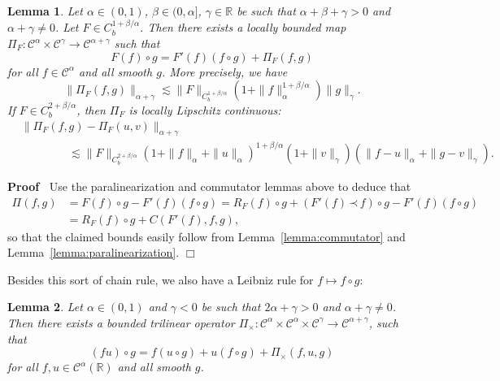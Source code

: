 \documentclass[a4paper,11pt]{article}
\newenvironment{proof}{\noindent\textbf{Proof\ }}{\hspace*{\fill}$\Box$\medskip}
\newtheorem{lemma}{Lemma}
{\theorembodyfont{\rmfamily}\newtheorem{remark}{Remark}}
\newcommand{\CC}{\mathscr{C}}
\newcommand{\lpara}{\,\mathord{\prec}\,}
\newcommand{\reso}{\,\mathord{\circ}\,}
\begin{document}
\begin{lemma}
  \label{lemma:para-taylor}Let $\alpha \in (0, 1)$, $\beta \in (0, \alpha]$,
  $\gamma \in \mathbb{R}$ be such that $\alpha + \beta + \gamma > 0$ and
  $\alpha + \gamma \neq 0$. Let $F \in C^{1 + \beta / \alpha}_b$. Then there
  exists a locally bounded map $\Pi_F : \CC^{\alpha} \times \CC^{\gamma}
  \rightarrow \CC^{\alpha + \gamma}$ such that
  \begin{equation}
    \label{eq:para-taylor} F (f) \reso g = F' (f)  (f \reso g) + \Pi_F (f, g)
  \end{equation}
  for all $f \in \CC^{\alpha}$ and all smooth $g$. More precisely, we have
  \[ \| \Pi_F (f, g)\|_{\alpha + \gamma} \lesssim \|F\|_{C^{1 + \beta /
     \alpha}_b}  (1 +\|f\|_{\alpha}^{1 + \beta / \alpha}) \|g\|_{\gamma} . \]
  If $F \in C^{2 + \beta / \alpha}_b$, then $\Pi_F$ is locally Lipschitz
  continuous:
  \begin{align*}
     &\| \Pi_F (f, g) - \Pi_F (u, v)\|_{\alpha + \gamma} \\
     &\hspace{50pt} \lesssim \|F\|_{C^{2 + \beta / \alpha}_b}  (1 +\|f\|_{\alpha} +\|u\|_{\alpha})^{1 + \beta / \alpha} (1 +\|v\|_{\gamma})  (\|f - u\|_{\alpha} +\|g - v\|_{\gamma}).
  \end{align*}
\end{lemma}

\begin{proof}
  Use the paralinearization and commutator lemmas above to deduce that
  \begin{align*}
    \Pi (f, g) & = F (f) \reso g - F' (f)  (f \reso g) = R_F (f) \reso g + (F'
    (f) \lpara f) \reso g - F' (f)  (f \reso g)\\
    & = R_F (f) \reso g + C (F' (f), f, g),
  \end{align*}
  so that the claimed bounds easily follow from Lemma~\ref{lemma:commutator}
  and Lemma~\ref{lemma:paralinearization}.
\end{proof}

Besides this sort of chain rule, we also have a Leibniz rule for $f \mapsto f
\reso g$:

\begin{lemma}
  \label{lem:para-taylor product}Let $\alpha \in (0, 1)$ and $\gamma < 0$ be
  such that $2 \alpha + \gamma > 0$ and $\alpha + \gamma \neq 0$. Then there
  exists a bounded trilinear operator $\Pi_{\times} : \CC^{\alpha} \times
  \CC^{\alpha} \times \CC^{\gamma} \rightarrow \CC^{\alpha + \gamma}$, such
  that
  \[ (fu) \reso g = f (u \reso g) + u (f \reso g) + \Pi_{\times} (f, u, g) \]
  for all $f, u \in \CC^{\alpha} (\mathbb{R})$ and all smooth $g$.
\end{lemma}
\end{document}
